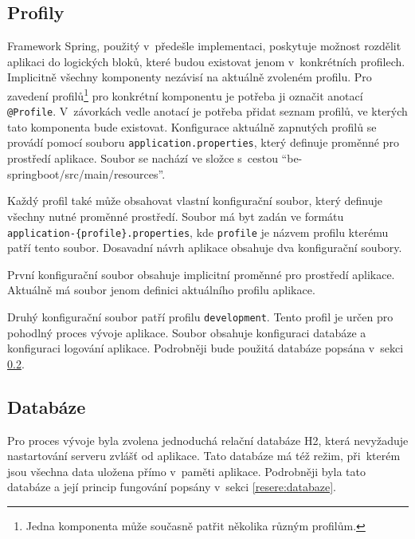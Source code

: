     \subsection{Profily}\label{analyza:soucasnaImplementace:profily}
        Framework Spring, použitý v~předešle implementaci, poskytuje možnost rozdělit aplikaci do logických bloků, které budou existovat jenom v~konkrétních profilech.\cite{spring-profile} Implicitně všechny komponenty nezávisí na aktuálně zvoleném profilu. Pro zavedení profilů\footnote{Jedna komponenta může současně patřit několika různým profilům.} pro konkrétní komponentu je potřeba ji označit anotací \texttt{@Profile}. V~závorkách vedle anotací je potřeba přidat seznam profilů, ve kterých tato komponenta bude existovat. Konfigurace aktuálně zapnutých profilů se provádí pomocí souboru \texttt{application.properties}, který definuje proměnné pro prostředí aplikace. Soubor se nachází ve složce s~cestou \enquote{be-springboot/src/main/resources}.
    
        Každý profil také může obsahovat vlastní konfigurační soubor, který definuje všechny nutné proměnné prostředí. Soubor má byt zadán ve formátu \texttt{application-\{profile\}.properties}, kde \texttt{profile} je názvem profilu kterému patří tento soubor. Dosavadní návrh aplikace obsahuje dva konfigurační soubory.
    
        První konfigurační soubor obsahuje implicitní proměnné pro prostředí aplikace. Aktuálně má soubor jenom definici aktuálního profilu aplikace. 
    
        Druhý konfigurační soubor patří profilu \texttt{development}. Tento profil je určen pro pohodlný proces vývoje aplikace. Soubor obsahuje konfiguraci databáze a konfiguraci logování aplikace. Podrobněji bude použitá databáze popsána v~sekci \ref{analyza:soucasnaImplementace:databaze}.
        
    \subsection{Databáze}\label{analyza:soucasnaImplementace:databaze}
        Pro proces vývoje byla zvolena jednoduchá relační databáze H2, která nevyžaduje nastartování serveru zvlášť od aplikace. Tato databáze má též režim, při~kterém jsou všechna data uložena přímo v~paměti aplikace. Podrobněji byla tato databáze a její princip fungování popsány v~sekci \ref{resere:databaze}.
    
